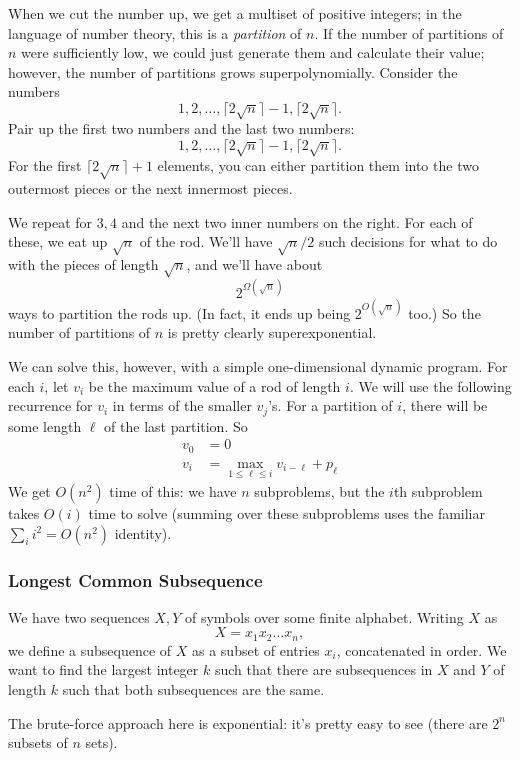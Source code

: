 \documentclass{article}
\begin{document}
When we cut the number up, we get a multiset of positive integers; in
the language of number theory, this is a \emph{partition} of $n$.
If the number of partitions of $n$ were sufficiently low, we could just
generate them and calculate their value; however, the number of partitions
grows superpolynomially.
Consider the numbers
$$
1,2,\ldots, \lceil 2\sqrt n \rceil - 1,
\lceil 2\sqrt n \rceil.
$$
Pair up the first two numbers and the last two numbers:
$$
1,2,\ldots, \lceil 2\sqrt n \rceil - 1,
\lceil 2\sqrt n \rceil.
$$
For the first $\lceil 2\sqrt n\rceil + 1$ elements, you can either
partition them into the two outermost pieces or the next
innermost pieces.

We repeat for $3,4$ and the next two inner numbers on the right.
For each of these, we eat up $\sqrt n$ of the rod.
We'll have $\sqrt n / 2$ such decisions for what to do with the
pieces of length $\sqrt n$, and we'll have about
$$
2^{\Omega(\sqrt n)}
$$
ways to partition the rods up.
(In fact, it ends up being $2^{O(\sqrt n)}$ too.)
So the number of partitions of $n$ is pretty clearly superexponential.

We can solve this, however, with a simple one-dimensional dynamic program.
For each $i$, let $v_i$ be the maximum value of a rod of
length $i$.
We will use the following recurrence for $v_i$ in terms of the smaller $v_j$'s.
For a partition of $i$, there will be some length $\ell$ of the last
partition.
So
\begin{align*}
v_0 &= 0 \\
v_i &=
\max_{1\leq \ell \leq i}
v_{i-\ell} + p_\ell
\end{align*}
We get $O(n^2)$ time of this: we have $n$ subproblems, but the $i$th
subproblem takes $O(i)$ time to solve (summing over these subproblems
uses the familiar $\sum_i i^2 = O(n^2)$ identity).


\subsubsection{Longest Common Subsequence}

We have two sequences $X,Y$ of symbols over some finite alphabet.
Writing $X$ as
$$
X = x_1 x_2 \dots x_n,
$$
we define a subsequence of $X$ as a subset of entries $x_i$, concatenated
in order.
We want to find the largest integer $k$ such that there are
subsequences in $X$ and $Y$ of length $k$ such that both subsequences are
the same.

The brute-force approach here is exponential: it's pretty easy to see (there are $2^n$ subsets of $n$ sets).
\end{document}
